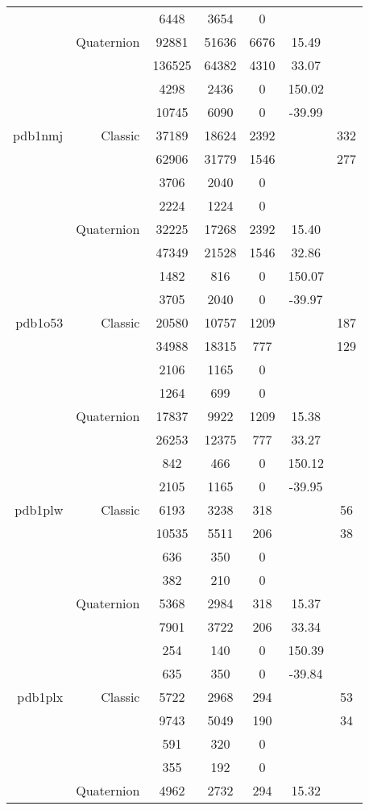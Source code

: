 \begin{xltabular}{\textwidth}{r|rcccSc}
& & 6448 & 3654 & 0 & & \\
& Quaternion & 92881 & 51636 & 6676 & 15.49 & \\
& & 136525 & 64382 & 4310 & 33.07 & \\
& & 4298 & 2436 & 0 & 150.02 & \\
& & 10745 & 6090 & 0 & -39.99 & \\ \addlinespace
pdb1nmj & Classic & 37189 & 18624 & 2392 & & 332 \\
& & 62906 & 31779 & 1546 & & 277 \\
& & 3706 & 2040 & 0 & & \\
& & 2224 & 1224 & 0 & & \\
& Quaternion & 32225 & 17268 & 2392 & 15.40 & \\
& & 47349 & 21528 & 1546 & 32.86 & \\
& & 1482 & 816 & 0 & 150.07 & \\
& & 3705 & 2040 & 0 & -39.97 & \\ \addlinespace
pdb1o53 & Classic & 20580 & 10757 & 1209 & & 187 \\
& & 34988 & 18315 & 777 & & 129 \\
& & 2106 & 1165 & 0 & & \\
& & 1264 & 699 & 0 & & \\
& Quaternion & 17837 & 9922 & 1209 & 15.38 & \\
& & 26253 & 12375 & 777 & 33.27 & \\
& & 842 & 466 & 0 & 150.12 & \\
& & 2105 & 1165 & 0 & -39.95 & \\ \addlinespace
pdb1plw & Classic & 6193 & 3238 & 318 & & 56 \\
& & 10535 & 5511 & 206 & & 38 \\
& & 636 & 350 & 0 & & \\
& & 382 & 210 & 0 & & \\
& Quaternion & 5368 & 2984 & 318 & 15.37 & \\
& & 7901 & 3722 & 206 & 33.34 & \\
& & 254 & 140 & 0 & 150.39 & \\
& & 635 & 350 & 0 & -39.84 & \\ \addlinespace
pdb1plx & Classic & 5722 & 2968 & 294 & & 53 \\
& & 9743 & 5049 & 190 & & 34 \\
& & 591 & 320 & 0 & & \\
& & 355 & 192 & 0 & & \\
& Quaternion & 4962 & 2732 & 294 & 15.32 & \\

\end{xltabular}

